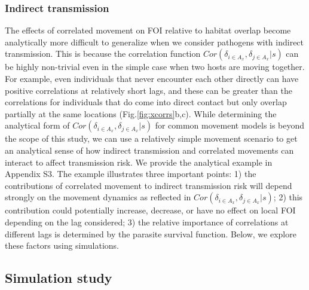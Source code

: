 \documentclass[letterpaper]{article}
\begin{document}
\subsubsection*{Indirect transmission}

The effects of correlated movement on FOI relative to habitat overlap become analytically more difficult to generalize when we consider pathogens with indirect transmission.  This is because the correlation function $Cor(\delta_{i \in A_x}, \delta_{j \in A_x} | s)$ can be highly non-trivial even in the simple case when two hosts are moving together. For example, even individuals that never encounter each other directly can have positive correlations at relatively short lags, and these can be greater than the correlations for individuals that do come into direct contact but only overlap partially at the same locations (Fig.\ref{fig:xcorrs}b,c).
While determining the analytical form of $Cor(\delta_{i \in A_x}, \delta_{j \in A_x} | s)$ for common movement models is beyond the scope of this study, we can use a relatively simple movement scenario to get an analytical sense of how indirect transmission and correlated movements can interact to affect transmission risk.  We provide the analytical example in Appendix S3. The example illustrates three important points: 1) the contributions of correlated movement to indirect transmission risk will depend strongly on the movement dynamics as reflected in $Cor(\delta_{i \in A_x}, \delta_{j \in A_x} | s)$; 2) this contribution could potentially increase, decrease, or have no effect on local FOI depending on the lag considered; 3) the relative importance of correlations at different lags is determined by the parasite survival function.
Below, we explore these factors using simulations.

\subsection*{Simulation study}

\end{document}
